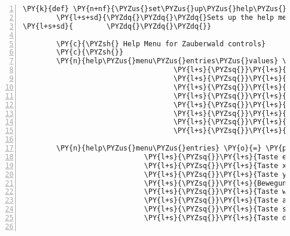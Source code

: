 \begin{Verbatim}[commandchars=\\\{\},numbers=left,firstnumber=1,stepnumber=1]
    \PY{k}{def} \PY{n+nf}{\PYZus{}set\PYZus{}up\PYZus{}help\PYZus{}menu}\PY{p}{(}\PY{n+nb+bp}{self}\PY{p}{)}\PY{p}{:}
        \PY{l+s+sd}{\PYZdq{}\PYZdq{}\PYZdq{}Sets up the help menu list.}
\PY{l+s+sd}{        \PYZdq{}\PYZdq{}\PYZdq{}}

        \PY{c}{\PYZsh{} Help Menu for Zauberwald controls}
        \PY{c}{\PYZsh{}}
        \PY{n}{help\PYZus{}menu\PYZus{}entries\PYZus{}values} \PY{o}{=} \PY{p}{\PYZob{}}\PY{l+s}{\PYZsq{}}\PY{l+s}{Taste q}\PY{l+s}{\PYZsq{}} \PY{p}{:} \PY{l+s}{\PYZsq{}}\PY{l+s}{Inventar öffnen}\PY{l+s}{\PYZsq{}}\PY{p}{,}
                                    \PY{l+s}{\PYZsq{}}\PY{l+s}{Taste e}\PY{l+s}{\PYZsq{}} \PY{p}{:} \PY{l+s}{\PYZsq{}}\PY{l+s}{Interaktionsmenü öffnen}\PY{l+s}{\PYZsq{}}\PY{p}{,}
                                    \PY{l+s}{\PYZsq{}}\PY{l+s}{Taste x}\PY{l+s}{\PYZsq{}} \PY{p}{:} \PY{l+s}{\PYZsq{}}\PY{l+s}{Spielerposition vorlesen}\PY{l+s}{\PYZsq{}}\PY{p}{,}
                                    \PY{l+s}{\PYZsq{}}\PY{l+s}{Taste y}\PY{l+s}{\PYZsq{}}\PY{p}{:} \PY{l+s}{\PYZsq{}}\PY{l+s}{Liste mit allen Objekten im Raum}\PY{l+s}{\PYZsq{}}\PY{p}{,}
                                    \PY{l+s}{\PYZsq{}}\PY{l+s}{Bewegung}\PY{l+s}{\PYZsq{}}\PY{p}{:} \PY{l+s}{\PYZsq{}}\PY{l+s}{w a s d Tasten}\PY{l+s}{\PYZsq{}}\PY{p}{,}
                                    \PY{l+s}{\PYZsq{}}\PY{l+s}{Taste w}\PY{l+s}{\PYZsq{}} \PY{p}{:} \PY{l+s}{\PYZsq{}}\PY{l+s}{Um ein Feld nach oben bewegen}\PY{l+s}{\PYZsq{}}\PY{p}{,}
                                    \PY{l+s}{\PYZsq{}}\PY{l+s}{Taste a}\PY{l+s}{\PYZsq{}} \PY{p}{:} \PY{l+s}{\PYZsq{}}\PY{l+s}{Um ein Feld nach links bewegen}\PY{l+s}{\PYZsq{}}\PY{p}{,}
                                    \PY{l+s}{\PYZsq{}}\PY{l+s}{Taste s}\PY{l+s}{\PYZsq{}} \PY{p}{:} \PY{l+s}{\PYZsq{}}\PY{l+s}{Um ein Feld nach unten bewegen}\PY{l+s}{\PYZsq{}}\PY{p}{,}
                                    \PY{l+s}{\PYZsq{}}\PY{l+s}{Taste d}\PY{l+s}{\PYZsq{}} \PY{p}{:} \PY{l+s}{\PYZsq{}}\PY{l+s}{Um ein Feld nach rechts bewegen}\PY{l+s}{\PYZsq{}}\PY{p}{\PYZcb{}}

        \PY{n}{help\PYZus{}menu\PYZus{}entries} \PY{o}{=} \PY{p}{[}\PY{l+s}{\PYZsq{}}\PY{l+s}{Taste q}\PY{l+s}{\PYZsq{}}\PY{p}{,}
                             \PY{l+s}{\PYZsq{}}\PY{l+s}{Taste e}\PY{l+s}{\PYZsq{}}\PY{p}{,}
                             \PY{l+s}{\PYZsq{}}\PY{l+s}{Taste x}\PY{l+s}{\PYZsq{}}\PY{p}{,}
                             \PY{l+s}{\PYZsq{}}\PY{l+s}{Taste y}\PY{l+s}{\PYZsq{}}\PY{p}{,}
                             \PY{l+s}{\PYZsq{}}\PY{l+s}{Bewegung}\PY{l+s}{\PYZsq{}}\PY{p}{,}
                             \PY{l+s}{\PYZsq{}}\PY{l+s}{Taste w}\PY{l+s}{\PYZsq{}}\PY{p}{,}
                             \PY{l+s}{\PYZsq{}}\PY{l+s}{Taste a}\PY{l+s}{\PYZsq{}}\PY{p}{,}
                             \PY{l+s}{\PYZsq{}}\PY{l+s}{Taste s}\PY{l+s}{\PYZsq{}}\PY{p}{,}
                             \PY{l+s}{\PYZsq{}}\PY{l+s}{Taste d}\PY{l+s}{\PYZsq{}}\PY{p}{]}


\end{Verbatim}
